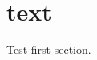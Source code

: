 \documentclass{beamer}
\begin{document}
\section{text}
\begin{frame}
    Test first section.
\end{frame}
\end{document}
